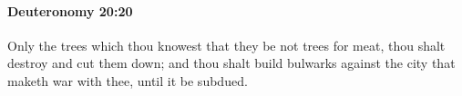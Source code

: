 
		\paragraph{Deuteronomy 20:20} %
			\label{DEUTERONOMY-20-20}

			Only the trees which thou knowest that they be not trees for meat, thou shalt destroy and cut them down; and thou shalt build bulwarks against the city that maketh war with thee, until it be subdued.

